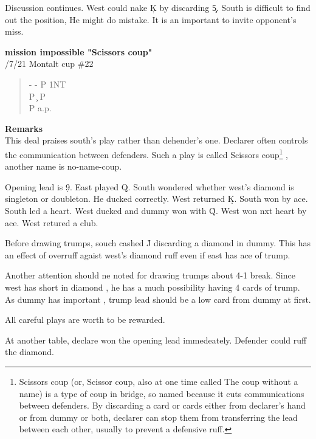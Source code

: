 Discussion continues. West could nake \c K by discarding 
\c 5. South is difficult to find out the position,
He might do mistake. It is an important to
invite opponent's miss.

{\bf mission impossible "Scissors coup"}\\

/7/21 Montalt cup \#22
\begin{quote}
%
  {}%
  {}
  {}%
  {}%
\end{quote}
\begin{quote}
\begin{bidding}
-  \> -  \> P \> 1NT \\
P \c \> P \s \\
P \s \> a.p.
\end{bidding}
\end{quote}
{\bf Remarks}\\
This deal praises south's play rather than dehender's one.
Declarer often controls the communication between defenders.
Such a play is called Scissors coup\footnote{
Scissors coup (or, Scissor coup, also at one time called The coup without a name) is a type of coup in bridge, so named because it cuts communications between defenders. By discarding a card or cards either from declarer's hand or from dummy or both, declarer can stop them from transferring the lead between each other, usually to prevent a defensive ruff.
}
, another name is
no-name-coup.

Opening lead is \d 9. East played \d Q.
South wondered whether west's diamond is 
singleton or doubleton. He ducked correctly.
West returned \d K. South won by ace.
South led a heart. West ducked and dummy won with \h Q.
West won nxt heart by ace. West retured a club.

Before drawing trumps, souch cashed \h J discarding 
a diamond in dummy. This has an effect of overruff agaist west's diamond ruff
even if east has ace of trump. 

Another attention should ne noted for drawing trumps
about 4-1 break. Since west has short in diamond , he 
has a much possibility having 4 cards of trump.
As dummy has important , trump lead should be a
low card from dummy at first. 

All careful plays are worth to be rewarded.

At another table, declare won the opening lead 
immedeately. Defender could ruff the diamond.

 